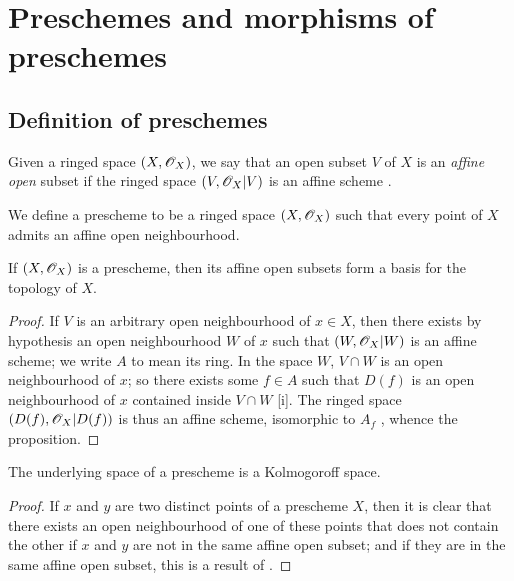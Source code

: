 \section{Preschemes and morphisms of preschemes}
\label{section:I.2}

\subsection{Definition of preschemes}
\label{subsection:I.2.1}

\begin{env}[2.1.1]
\label{I.2.1.1}
Given a ringed space $(X,\mathscr{O}_X)$, we say that an open subset $V$ of $X$ is an \emph{affine open} subset if the ringed space $(V,\mathscr{O}_X|V)$ is an affine scheme .
\end{env}

\begin{definition}[2.1.2]
\label{I.2.1.2}
We define a prescheme to be a ringed space $(X,\mathscr{O}_X)$ such that every point of $X$ admits an affine open neighbourhood.
\end{definition}

\begin{proposition}[2.1.3]
\label{I.2.1.3}
If $(X,\mathscr{O}_X)$ is a prescheme, then its affine open subsets form a basis for the topology of $X$.
\end{proposition}

\begin{proof}
If $V$ is an arbitrary open neighbourhood of $x\in X$, then there exists by hypothesis an open neighbourhood $W$ of $x$ such that $(W,\mathscr{O}_X|W)$ is an affine scheme;
we write $A$ to mean its ring.
In the space $W$, $V\cap W$ is an open neighbourhood of $x$;
so there exists some $f\in A$ such that $D(f)$ is an open neighbourhood of $x$ contained inside $V\cap W$ [i].
The ringed space $(D(f),\mathscr{O}_X|D(f))$ is thus an affine scheme, isomorphic to $A_f$ , whence the proposition.
\end{proof}

\begin{proposition}[2.1.4]
\label{I.2.1.4}
The underlying space of a prescheme is a Kolmogoroff space.
\end{proposition}

\begin{proof}
If $x$ and $y$ are two distinct points of a prescheme $X$, then it is clear that there exists an open neighbourhood of one of these points that does not contain the other if $x$ and $y$ are not in the same affine open subset; and if they are in the same affine open subset, this is a result of .
\end{proof}


